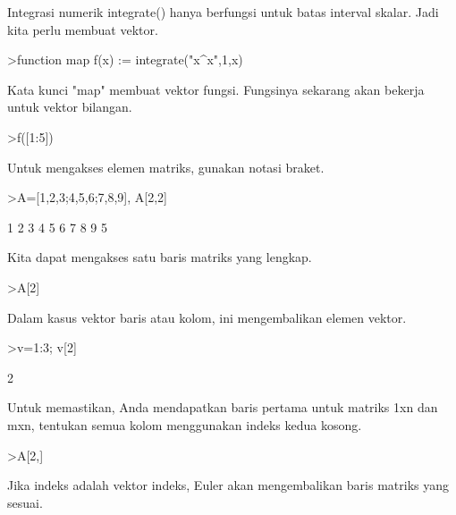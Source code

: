 \documentclass[a4paper,10pt]{article}
\begin{document}
\begin{eulernotebook}
\begin{eulercomment}
\begin{eulercomment}
\begin{eulercomment}
\begin{eulercomment}
\begin{eulercomment}
\begin{eulercomment}
\begin{eulercomment}
Integrasi numerik integrate() hanya berfungsi untuk batas interval
skalar. Jadi kita perlu membuat vektor.
\end{eulercomment}
\begin{eulerprompt}
>function map f(x) := integrate("x^x",1,x)
\end{eulerprompt}
\begin{eulercomment}
Kata kunci "map" membuat vektor fungsi. Fungsinya sekarang akan
bekerja\\
untuk vektor bilangan.
\end{eulercomment}
\begin{eulerprompt}
>f([1:5])
\end{eulerprompt}
\begin{euleroutput}
  [0,  2.05045,  13.7251,  113.336,  1241.03]
\end{euleroutput}
\begin{eulercomment}
Untuk mengakses elemen matriks, gunakan notasi braket.
\end{eulercomment}
\begin{eulerprompt}
>A=[1,2,3;4,5,6;7,8,9], A[2,2]
\end{eulerprompt}
\begin{euleroutput}
              1             2             3 
              4             5             6 
              7             8             9 
  5
\end{euleroutput}
\begin{eulercomment}
Kita dapat mengakses satu baris matriks yang lengkap.
\end{eulercomment}
\begin{eulerprompt}
>A[2]
\end{eulerprompt}
\begin{euleroutput}
  [4,  5,  6]
\end{euleroutput}
\begin{eulercomment}
Dalam kasus vektor baris atau kolom, ini mengembalikan elemen vektor.
\end{eulercomment}
\begin{eulerprompt}
>v=1:3; v[2]
\end{eulerprompt}
\begin{euleroutput}
  2
\end{euleroutput}
\begin{eulercomment}
Untuk memastikan, Anda mendapatkan baris pertama untuk matriks 1xn dan
mxn, tentukan semua kolom menggunakan indeks kedua kosong.
\end{eulercomment}
\begin{eulerprompt}
>A[2,]
\end{eulerprompt}
\begin{euleroutput}
  [4,  5,  6]
\end{euleroutput}
\begin{eulercomment}
Jika indeks adalah vektor indeks, Euler akan mengembalikan baris
matriks yang sesuai.


\end{eulercomment}
\end{eulercomment}
\end{eulercomment}
\end{eulercomment}
\end{eulercomment}
\end{eulercomment}
\end{eulercomment}
\end{eulernotebook}
\end{document}
